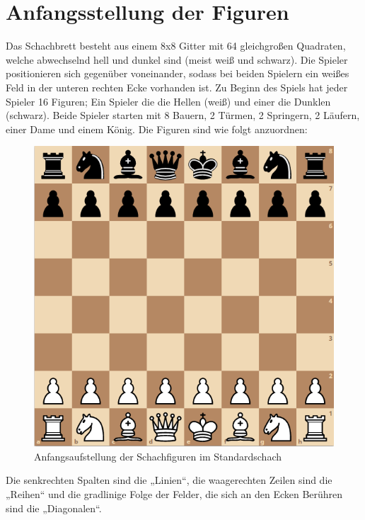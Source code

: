 \documentclass[a4paper, 10pt]{scrartcl}
\begin{document}
\section{Anfangsstellung der Figuren}
Das Schachbrett besteht aus einem 8x8 Gitter mit 64 gleichgroßen Quadraten, welche abwechselnd hell und dunkel sind (meist weiß und schwarz).
Die Spieler positionieren sich gegenüber voneinander, sodass bei beiden Spielern ein weißes Feld in der unteren rechten Ecke vorhanden ist.
Zu Beginn des Spiels hat jeder Spieler 16 Figuren; Ein Spieler die die Hellen (weiß) und einer die Dunklen (schwarz).
Beide Spieler starten mit 8 Bauern, 2 Türmen, 2 Springern, 2 Läufern, einer Dame und einem König.
Die Figuren sind wie folgt anzuordnen:

\begin{figure}[h]
        \centering
        \includegraphics[scale=0.5]{assets/chess-opening.png}
        \caption{Anfangsaufstellung der Schachfiguren im Standardschach}
\end{figure}


Die senkrechten Spalten sind die „Linien“, die waagerechten Zeilen sind die „Reihen“ und die gradlinige Folge der Felder, die sich an den Ecken Berühren sind die „Diagonalen“.
\end{document}
